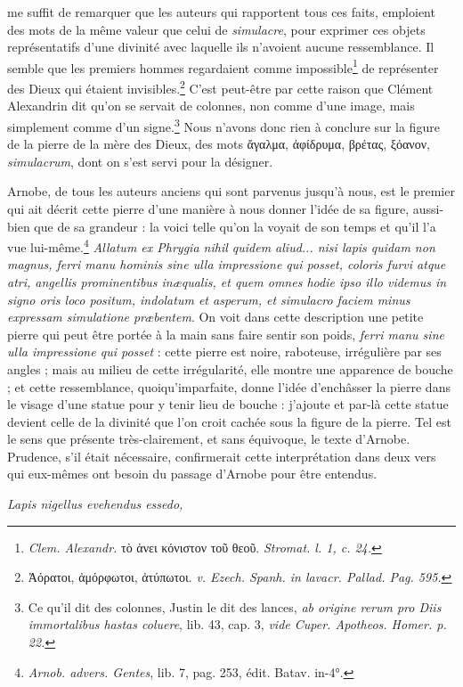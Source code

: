\documentclass[a4paper, 11pt, oneside, polutonikogreek, french]{article}
\begin{document}
me suffit de remarquer que les auteurs qui rapportent tous ces faits, emploient des mots de la même valeur que celui de \emph{simulacre}, pour exprimer ces objets représentatifs d'une divinité avec laquelle ils n'avoient aucune ressemblance. Il semble que les premiers hommes regardaient comme impossible\footnote{\emph{Clem. Alexandr.} τὸ ἀνει κόνιστον τοῦ θεοῦ. \emph{Stromat. l. 1, c. 24.}} de représenter des Dieux qui étaient invisibles.\footnote{Ἀόρατοι, ἀμόρφωτοι, ἀτύπωτοι. \emph{v. Ezech. Spanh. in lavacr. Pallad. Pag. 595.}} C'est peut-être par cette raison que Clément Alexandrin dit qu'on se servait de colonnes, non comme d'une image, mais simplement comme d'un signe.\footnote{Ce qu'il dit des colonnes, Justin le dit des lances, \emph{ab origine rerum pro Diis immortalibus hastas coluere}, lib. 43, cap. 3, \emph{vide Cuper. Apotheos. Homer. p. 22.}} Nous n'avons donc rien à conclure sur la figure de la pierre de la mère des Dieux, des mots ἄγαλμα, ἀφίδρυμα, βρέτας, ξόανον, \emph{simulacrum}, dont on s'est servi pour la désigner.

Arnobe, de tous les auteurs anciens qui sont parvenus jusqu'à nous, est le premier qui ait décrit cette pierre d'une manière à nous donner l'idée de sa figure, aussi-bien que de sa grandeur : la voici telle qu'on la voyait de son temps et qu'il l'a vue lui-même.\footnote{\emph{Arnob. advers. Gentes}, lib. 7, pag. 253, édit. Batav. in-4°.} \emph{Allatum ex Phrygia nihil quidem aliud... nisi lapis quidam non magnus, ferri manu hominis sine ulla impressione qui posset, coloris furvi atque atri, angellis prominentibus inæqualis, et quem omnes hodie ipso illo videmus in signo oris loco positum, indolatum et asperum, et simulacro faciem minus expressam simulatione præbentem}. On voit dans cette description une petite pierre qui peut être portée à la main sans faire sentir son poids, \emph{ferri manu sine ulla impressione qui posset} : cette pierre est noire, raboteuse, irrégulière par ses angles ; mais au milieu de cette irrégularité, elle montre une apparence de bouche ; et cette ressemblance, quoiqu'imparfaite, donne l'idée d'enchâsser la pierre dans le visage d'une statue pour y tenir lieu de bouche : j'ajoute et par-là cette statue devient celle de la divinité que l'on croit cachée sous la figure de la pierre. Tel est le sens que présente très-clairement, et sans équivoque, le texte d'Arnobe. Prudence, s'il était nécessaire, confirmerait cette interprétation dans deux vers qui eux-mêmes ont besoin du passage d'Arnobe pour être entendus.

\emph{Lapis nigellus evehendus essedo,}  
\end{document}
